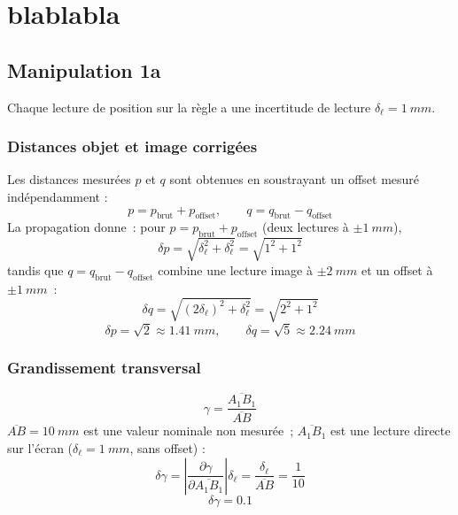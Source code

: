 ﻿\documentclass[a4paper, 11pt]{article}
\begin{document}
\section{blablabla}
\pagebreak
\subsection{Manipulation 1a}

Chaque lecture de position sur la règle a une
incertitude de lecture $\delta_\ell = \SI{1}{mm}$.

\subsubsection{Distances objet et image corrigées}

Les distances mesurées $p$ et $q$ sont obtenues en soustrayant un offset
mesuré indépendamment :
\begin{equation}
  p = p_\text{brut} + p_\text{offset}, \qquad
  q = q_\text{brut} - q_\text{offset}
\end{equation}
La propagation donne~: pour $p = p_\text{brut} + p_\text{offset}$ (deux lectures à $\pm\SI{1}{mm}$),
\begin{equation}
  \delta p = \sqrt{\delta_\ell^2 + \delta_\ell^2} = \sqrt{1^2 + 1^2}
\end{equation}
tandis que $q = q_\text{brut} - q_\text{offset}$ combine une lecture image à $\pm\SI{2}{mm}$ et un offset à $\pm\SI{1}{mm}$~:
\begin{equation}
  \delta q = \sqrt{(2\delta_\ell)^2 + \delta_\ell^2} = \sqrt{2^2 + 1^2}
\end{equation}
\begin{equation}
  \boxed{\delta p = \sqrt{2} \approx \SI{1.41}{mm}, \qquad \delta q = \sqrt{5} \approx \SI{2.24}{mm}}
\end{equation}

\subsubsection{Grandissement transversal}

\begin{equation}
  \gamma = \frac{\overline{A_1B_1}}{\overline{AB}}
\end{equation}
$\overline{AB} = \SI{10}{mm}$ est une valeur nominale non mesurée~;
$\overline{A_1B_1}$ est une lecture directe sur l'écran ($\delta_\ell = \SI{1}{mm}$,
sans offset) :
\begin{equation}
  \delta\gamma
  = \left|\frac{\partial \gamma}{\partial \overline{A_1B_1}}\right| \delta_\ell
  = \frac{\delta_\ell}{\overline{AB}}
  = \frac{1}{10}
\end{equation}
\begin{equation}
  \boxed{\delta\gamma = 0.1}
\end{equation}
\end{document}
